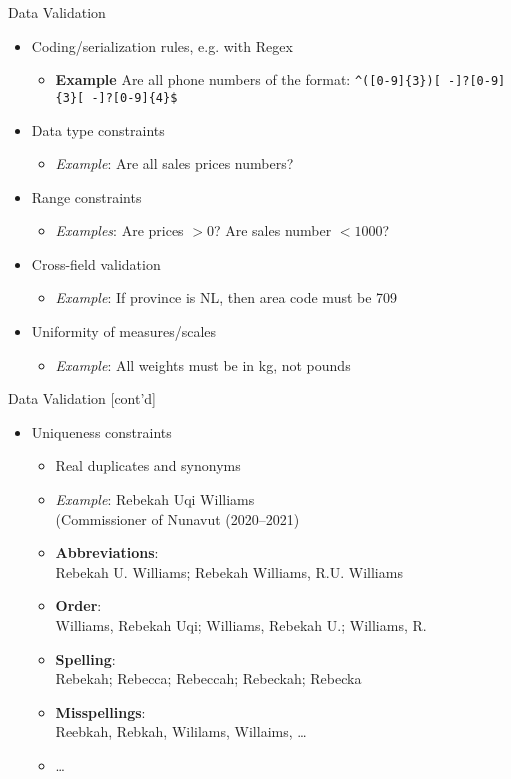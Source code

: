 \documentclass[ignorenonframetext,xcolor=x11names]{beamer}
\begin{document}
\begin{frame}{Data Validation}
\begin{itemize}
 \item Coding/serialization rules, e.g. with Regex 
 \begin{itemize}
   \item \textbf{Example} Are all phone numbers of the format: 
   \colorbox{code}{\texttt{\footnotesize \Verb_^([0-9]{3})[ -]?[0-9]{3}[ -]?[0-9]{4}$_}}
 \end{itemize}
 \item Data type constraints
 \begin{itemize}
   \item \emph{Example}: Are all sales prices numbers?
 \end{itemize}
 \item Range constraints
 \begin{itemize}
   \item \emph{Examples}: Are prices $> 0$? Are sales number $< 1000$?
 \end{itemize}
 \item Cross-field validation
 \begin{itemize}
   \item \emph{Example}: If province is NL, then area code must be 709
 \end{itemize}
 \item Uniformity of measures/scales
 \begin{itemize}
   \item \emph{Example}: All weights must be in kg, not pounds
 \end{itemize}
\end{itemize}
\end{frame}

\begin{frame}{Data Validation \small [cont'd]}
\begin{itemize}
 \item Uniqueness constraints
 \begin{itemize}
   \item Real duplicates and synonyms
   \item \emph{Example}: Rebekah Uqi Williams \\ (Commissioner of Nunavut (2020--2021)
   \item \textbf{Abbreviations}: \\ Rebekah U. Williams; Rebekah Williams, R.U. Williams
   \item \textbf{Order}: \\ Williams, Rebekah Uqi; Williams, Rebekah U.; Williams, R.
   \item \textbf{Spelling}: \\ Rebekah; Rebecca; Rebeccah; Rebeckah; Rebecka
   \item \textbf{Misspellings}: \\ Reebkah, Rebkah, Wililams, Willaims, \ldots
   \item \ldots
 \end{itemize}
\end{itemize}
\end{frame}
\end{document}
